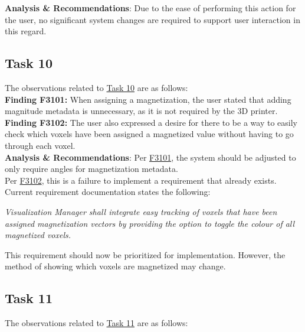 \documentclass{article}
\begin{document}
\noindent \textbf{Analysis \& Recommendations}:
Due to the ease of performing this action for the user, no significant system changes are required to support user interaction in this regard.

\subsection{Task 10}

\noindent The observations related to \hyperlink{task:T10}{Task 10} are as follows:\\

\noindent \hypertarget{finding:F3101}{\textbf{Finding F3101:}} 
When assigning a magnetization, the user stated that adding magnitude metadata is unnecessary, as it is not required by the 3D printer.\\ 

\noindent \hypertarget{finding:F3101}{\textbf{Finding F3102:}} 
The user also expressed a desire for there to be a way to easily check which voxels have been assigned a magnetized value without having to go through each voxel.\\ 

\noindent \textbf{Analysis \& Recommendations}:
Per \hyperlink{finding:F3101}{F3101}, the system should be adjusted to only require angles for magnetization metadata.\\

\noindent Per \hyperlink{finding:F3102}{F3102}, this is a failure to implement a requirement that already exists. Current requirement documentation states the following:

\begin{center}
    \textit{Visualization Manager shall integrate easy tracking of voxels that have been assigned magnetization vectors by providing the option to toggle the colour of all magnetized voxels. }\\
  \end{center}

This requirement should now be prioritized for implementation. However, the method of showing which voxels are magnetized may change.

\subsection{Task 11}

\noindent The observations related to \hyperlink{task:T11}{Task 11} are as follows:\\
\end{document}
